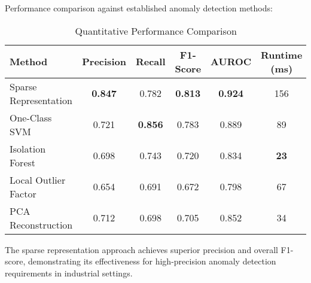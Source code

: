 \documentclass[12pt]{article}
\begin{document}
Performance comparison against established anomaly detection methods:

\begin{table}[h]
    \centering
    \caption{Quantitative Performance Comparison}
    \label{tab:performance_comparison}
    \begin{tabular}{lccccc}
        \toprule
        Method                & Precision      & Recall         & F1-Score       & AUROC          & Runtime (ms) \\
        \midrule
        Sparse Representation & \textbf{0.847} & 0.782          & \textbf{0.813} & \textbf{0.924} & 156          \\
        One-Class SVM         & 0.721          & \textbf{0.856} & 0.783          & 0.889          & 89           \\
        Isolation Forest      & 0.698          & 0.743          & 0.720          & 0.834          & \textbf{23}  \\
        Local Outlier Factor  & 0.654          & 0.691          & 0.672          & 0.798          & 67           \\
        PCA Reconstruction    & 0.712          & 0.698          & 0.705          & 0.852          & 34           \\
        \bottomrule
    \end{tabular}
\end{table}

The sparse representation approach achieves superior precision and overall F1-score, demonstrating its effectiveness for high-precision anomaly detection requirements in industrial settings.
\end{document}
